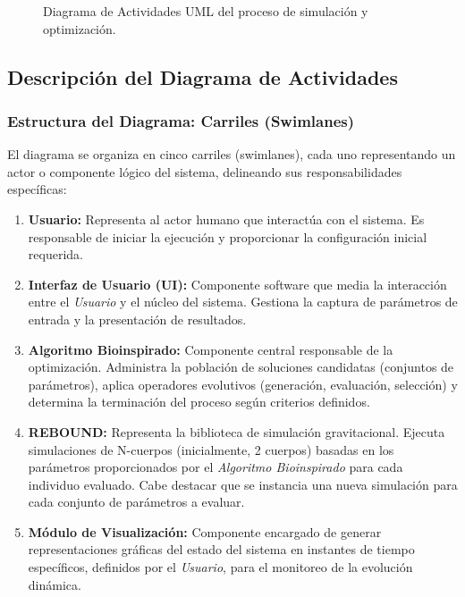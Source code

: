 \begin{figure}[H] %
    \centering
	
    \caption{Diagrama de Actividades UML del proceso de simulación y optimización.}%
    \label{fig:activity_diagram} %
\end{figure}

\subsection{Descripción del Diagrama de Actividades}

\subsubsection{Estructura del Diagrama: Carriles (Swimlanes)}

El diagrama se organiza en cinco carriles (swimlanes), cada uno representando un actor o componente lógico del sistema, delineando sus responsabilidades específicas:

\begin{enumerate}
    \item \textbf{Usuario:} Representa al actor humano que interactúa con el sistema. Es responsable de iniciar la ejecución y proporcionar la configuración inicial requerida.
    \item \textbf{Interfaz de Usuario (UI):} Componente software que media la interacción entre el \textit{Usuario} y el núcleo del sistema. Gestiona la captura de parámetros de entrada y la presentación de resultados.
    \item \textbf{Algoritmo Bioinspirado:} Componente central responsable de la optimización. Administra la población de soluciones candidatas (conjuntos de parámetros), aplica operadores evolutivos (generación, evaluación, selección) y determina la terminación del proceso según criterios definidos.
    \item \textbf{REBOUND:} Representa la biblioteca de simulación gravitacional. Ejecuta simulaciones de N-cuerpos (inicialmente, 2 cuerpos) basadas en los parámetros proporcionados por el \textit{Algoritmo Bioinspirado} para cada individuo evaluado. Cabe destacar que se instancia una nueva simulación para cada conjunto de parámetros a evaluar.
    \item \textbf{Módulo de Visualización:} Componente encargado de generar representaciones gráficas del estado del sistema en instantes de tiempo específicos, definidos por el \textit{Usuario}, para el monitoreo de la evolución dinámica.
\end{enumerate}

